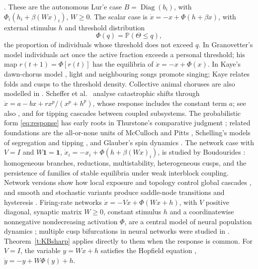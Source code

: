. These are the autonomous Lur'e case $B=\operatorname{Diag}(b_i)$, with $\Phi_i(h_i+\beta(Wx)_i)$, $W\ge0$. The scalar case is $\dot x=-x+\Phi(h+\beta x)$, with external stimulus $h$ and threshold distribution
\begin{equation}\label{eq:response}
 \Phi(q)=\mathbb P(\Theta\le q),
\end{equation}
the proportion of individuals whose threshold does not exceed $q$. In Granovetter's model
\cite{granovetter1978} individuals act once the active fraction exceeds a personal threshold; his map
$r(t+1)=\Phi[r(t)]$ has the equilibria of $\dot x=-x+\Phi(x)$. In Kaye's dawn-chorus model \cite{Kaye26}, light
and neighbouring songs promote singing; Kaye relates folds and cusps to the threshold density. Collective animal choruses are also modelled in
\cite{Aihara2014,HartbauerRomer2016}.
\im Scheffer et al.\ \cite{Scheffer2001} analyse catastrophic shifts through
$\dot x=a-bx+rx^p/(x^p+h^p)$, whose response includes the constant term $a$; see also
\cite{Scheffer2009,Kuehn2011}, and \cite{kroenke2020} for tipping cascades between coupled subsystems.
\im The probabilistic form \eqref{eq:response} has early roots in Thurstone's comparative judgment \cite{Thurstone1927}; related
foundations are the all-or-none units of McCulloch and Pitts \cite{McCulloch1943}, Schelling's models of segregation and tipping
\cite{Schelling1971}, and Glauber's spin dynamics \cite{Glauber1963}.
\im
The network case with $V=I$ and $W\mathbf1=\mathbf1$, $\dot x_i=-x_i+\Phi(h+\beta(Wx)_i)$, is studied by Boudourides
\cite{Boud26}: homogeneous branches, reductions, multistability, heterogeneous cusps, and the persistence of families of
stable equilibria under weak interblock coupling. Network versions show how local exposure and topology control global
cascades \cite{Watts2002}, and smooth and stochastic variants produce saddle-node transitions and hysteresis
\cite{Wiedermann2020,Kook2021}.
\im
Firing-rate networks $\dot x=-Vx+\Phi(Wx+h)$, with $V$ positive diagonal, synaptic matrix $W\ge0$, constant stimulus $h$ and a
coordinatewise nonnegative nondecreasing activation $\Phi$, are a central model of neural
population dynamics \cite{Betteti2025,Davydov,Gokhale2026}; multiple cusp bifurcations in neural networks were studied in
\cite{Izhikevich1998}. Theorem~\ref{t:KBsharp} applies directly to them when the response is common. For $V=I$, the variable $y=Wx+h$ satisfies the
Hopfield equation \cite{Hopfield1984}, $\dot y=-y+W\Phi(y)+h$.
\EEN


